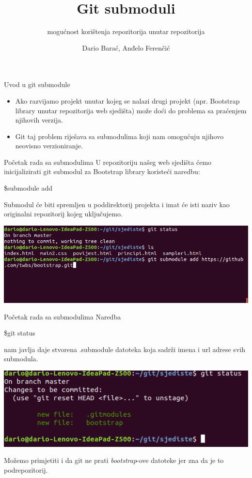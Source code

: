 \documentclass[10pt]{beamer}
\title{Git submoduli}
\subtitle{mogućnost korištenja repozitorija unutar repozitorija}
\date{}
\author{Dario Barać, Anđelo Ferenčić}
\begin{document}
\nocite{*}
\maketitle



\begin{frame}{Uvod u git submodule}
\begin{itemize}
	\item Ako razvijamo projekt unutar kojeg se nalazi drugi projekt (npr. Bootstrap library unutar repozitorija web sjedišta) može doći do problema sa praćenjem njihovih verzija.
	\item Git taj problem riješava sa submodulima koji nam omogućuju njihovo neovisno verzioniranje.
\end{itemize}	
\end{frame}

\begin{frame}[fragile]{Početak rada sa submodulima}
 	U repozitoriju našeg web sjedišta ćemo inicijalizirati git submodul za Bootstrap library koristeći naredbu: \begin{semiverbatim}\$submodule add \end{semiverbatim}
 	Submodul će biti spremljen u poddirektorij projekta i imat će isti naziv kao originalni repozitorij kojeg uključujemo.

	\includegraphics[scale=0.35]{submoduli_pocetak}
\end{frame}

\begin{frame}[fragile]{Početak rada sa submodulima}
	Naredba \begin{semiverbatim}\$git status \end{semiverbatim} nam javlja daje stvorena .submodule datoteka koja sadrži imena i url adrese svih submodula. 

	\includegraphics[scale=0.45]{submoduli_status}

	Možemo primjetiti i da git ne prati \emph{bootstrap}-ove datoteke jer zna da je to podrepozitorij.
\end{frame}
\end{document}
